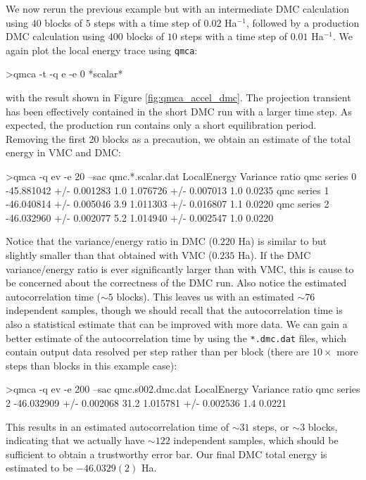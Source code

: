 We now rerun the previous example but with an intermediate DMC 
calculation using $40$ blocks of $5$ steps with a time step of 
$0.02$ Ha$^{-1}$, followed by a production DMC calculation 
using $400$ blocks of $10$ steps with a time step of $0.01$ Ha$^{-1}$.
We again plot the local energy trace using \texttt{qmca}:
\begin{shade}
>qmca -t -q e -e 0 *scalar* 
\end{shade}
\noindent
with the result shown in Figure \ref{fig:qmca_accel_dmc}.
The projection transient has been effectively contained in the 
short DMC run with a larger time step.  As expected, the 
production run contains only a short equilibration period.
Removing the first 20 blocks as a precaution, we obtain an estimate 
of the total energy in VMC and DMC:
\begin{shade}
>qmca -q ev -e 20 --sac qmc.*.scalar.dat 
                            LocalEnergy               Variance           ratio 
qmc  series 0  -45.881042 +/- 0.001283    1.0   1.076726 +/- 0.007013    1.0   0.0235 
qmc  series 1  -46.040814 +/- 0.005046    3.9   1.011303 +/- 0.016807    1.1   0.0220 
qmc  series 2  -46.032960 +/- 0.002077    5.2   1.014940 +/- 0.002547    1.0   0.0220 
\end{shade}
\noindent
Notice that the variance/energy ratio in DMC ($0.220$ Ha) is similar to but 
slightly smaller than that obtained with VMC ($0.235$ Ha).  If the DMC 
variance/energy ratio is ever significantly larger than with VMC, this is 
cause to be concerned about the correctness of the DMC run.  Also notice 
the estimated autocorrelation time ($\sim 5$ blocks).  This leaves us with 
an estimated $\sim 76$ independent samples, though we should recall that 
the autocorrelation time is also a statistical estimate that can be improved 
with more data.  We can gain a better estimate of the autocorrelation 
time by using the \texttt{*.dmc.dat} files, which contain output data resolved 
per step rather than per block (there are $10\times$ more steps than blocks 
in this example case):
\begin{shade}
>qmca -q ev -e 200 --sac qmc.s002.dmc.dat 
                            LocalEnergy               Variance           ratio 
qmc  series 2  -46.032909 +/- 0.002068   31.2   1.015781 +/- 0.002536    1.4   0.0221 
\end{shade}
\noindent
This results in an estimated autocorrelation time of $\sim 31$ steps, or 
$\sim 3$ blocks, indicating that we actually have $\sim 122$ independent 
samples, which should be sufficient to obtain a trustworthy error bar.
Our final DMC total energy is estimated to be $-46.0329(2)$ Ha.

